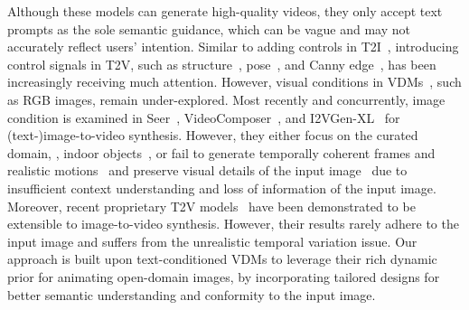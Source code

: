 Although these models can generate high-quality videos, they only accept text prompts as the sole semantic guidance, which can be vague and may not accurately reflect users' intention. Similar to adding controls in T2I~\cite{zhang2023adding,mou2023t2i,ye2023ipadapter,shi2023instancebooth}, introducing control signals in T2V, such as structure~\cite{esser2023structure,xing2023make}, pose~\cite{ma2023follow,zhang2023controlvideo}, and Canny edge~\cite{khachatryan2023text2video}, has been increasingly receiving much attention.
However, visual conditions in VDMs~\cite{tang2023any,yin2023dragnuwa}, such as RGB images, remain under-explored. Most recently and concurrently, image condition is examined in Seer~\cite{gu2023seer}, VideoComposer~\cite{wang2023videocomposer},  and I2VGen-XL~\cite{I2VGen-XL} for (text-)image-to-video synthesis.
However, they either focus on the curated domain, \ie, indoor objects~\cite{gu2023seer}, or fail to generate temporally coherent frames and realistic motions~\cite{wang2023videocomposer} and preserve visual details of the input image~\cite{I2VGen-XL} due to insufficient context understanding and loss of information of the input image. 
Moreover, recent proprietary T2V models~\cite{singer2022make,molad2023dreamix,villegas2023phenaki,yu2023magvit} have been demonstrated to be extensible to image-to-video synthesis. However, their results rarely adhere to the input image and suffers from the unrealistic temporal variation issue. Our approach is built upon text-conditioned VDMs to leverage their rich dynamic prior for animating open-domain images, by incorporating tailored designs for better semantic understanding and conformity to the input image.